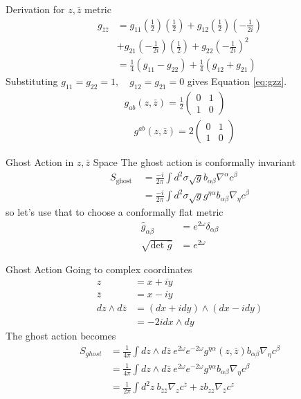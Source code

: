\documentclass{beamer}
\begin{document}
\begin{frame}{Derivation for $z,\bar{z}$ metric}
    \begin{align}
g_{\bar z \bar z}&=g_{11}\left(\frac{1}{2}\right)\left(\frac{1}{2}\right)+g_{12}\left(\frac{1}{2}\right)\left(-\frac{1}{2 i}\right)\\&+g_{21}\left(-\frac{1}{2 i}\right)\left(\frac{1}{2}\right)+g_{22}\left(-\frac{1}{2 i}\right)^2 \\
& =\frac{1}{4}\left(g_{11}-g_{22}\right)+\frac{1}{4}\left(g_{12}+g_{21}\right)
    \end{align}
    Substituting $g_{11} = g_{22} = 1, \quad g_{12} = g_{21} = 0$ gives Equation \ref{eq:gzz}.
    \begin{align}
    g_{a b}{(z, \bar{z})}=\frac{1}{2}\left(\begin{array}{ll}
0 & 1 \\
1 & 0
\end{array}\right) \\
\quad g^{a b}{(z, \bar{z})}=2 \left(\begin{array}{ll}
0 & 1 \\
1 & 0\end{array}\right)\end{align}
\end{frame}
\begin{frame}{Ghost Action in $z,\bar z$ Space}
    The ghost action is conformally invariant
    \begin{align}
        S_{\text {ghost }}&=\frac{-i}{2 \pi} \int d^2 \sigma \sqrt{g} b_{\alpha \beta} \nabla^\alpha c^\beta 
        \\
        &= \frac{-i}{2 \pi} \int d^2 \sigma \sqrt{g} g^{\eta\alpha} b_{\alpha \beta} \nabla_\eta c^\beta
    \end{align}
    so let's use that to choose a conformally flat metric
    \begin{align}
        \hat{g}_{\alpha \beta}&=e^{2 \omega}  \delta_{\alpha\beta}\\
        \sqrt{\text{det }\hat{g}} &= e^{2\omega}
    \end{align}
\end{frame}
\begin{frame}{Ghost Action}
    Going to complex coordinates
    \begin{align}
z & = x+iy\\
\bar z & = x-iy\\
dz \wedge d\bar z &= (dx + idy )\wedge (dx-idy)\\
&= -2i dx \wedge dy
    \end{align}
    The ghost action becomes
    \begin{align}
        S_{ghost} &= \frac{1}{4\pi} \int dz\wedge d\bar z\ e^{2\omega} e^{-2\omega} g^{\eta\alpha} (z,\bar z) b_{\alpha\beta } \nabla_{\eta} c^\beta \\
        &= \frac{1}{4\pi} \int dz\wedge d\bar z\ e^{2\omega} e^{-2\omega} g^{\eta\alpha} b_{\alpha\beta } \nabla_{\eta} c^\beta \\
        &= \frac{1}{2\pi} \int d^2z\ b_{\bar z \bar{z} } \nabla_{z} c^{\bar z} + z b_{z {z} } \nabla_{\bar z} c^z\\
    \end{align}
\end{frame}
\end{document}
